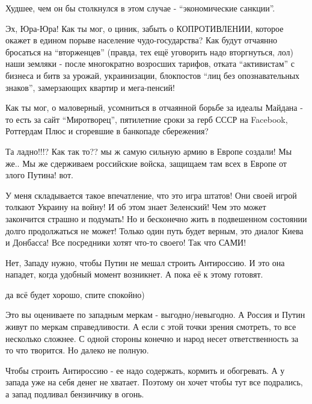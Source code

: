 \begin{itemize}

Худшее, чем он бы столкнулся в этом случае - \enquote{экономические санкции}.

Эх, Юра-Юра! Как ты мог, о циник, забыть о КОПРОТИВЛЕНИИ, которое окажет в
едином порыве население чудо-государства? Как будут отчаянно бросаться на
\enquote{вторженцев} (правда, тех ещё уговорить надо вторгнуться, лол) наши земляки -
после многократно возросших тарифов, отката \enquote{активистам} с бизнеса  и битв за
урожай, украинизации, блокпостов \enquote{лиц без опознавательных знаков}, замерзающих
квартир и мега-пенсий! 

Как ты мог, о маловерный, усомниться в отчаянной борьбе за идеалы Майдана - то
есть за сайт \enquote{Миротворец}, пятилетние сроки за герб СССР на Facebook, Роттердам
Плюс и сгоревшие в банкопаде сбережения?


Та ладно!!!? Как так то?? мы ж самую сильную армию в Европе создали! Мы же.. Мы
же сдерживаем российские войска, защищаем там всех в Европе от злого Путина!
вот.


У меня складывается такое впечатление, что это игра штатов! Они своей игрой
толкают Украину на войну! И об этом знает Зеленский! Чем это может закончится
страшно и подумать! Но и бесконечно жить в подвешенном состоянии долго
продолжаться не может! Только один путь будет верным, это диалог Киева и
Донбасса!  Все посредники хотят что-то своего! Так что САМИ!


Нет, Западу нужно, чтобы Путин не мешал строить Антироссию. И это она нападет,
когда удобный момент возникнет. А пока её к этому готовят.


да всё будет хорошо, спите  спокойно)


Это вы оцениваете по западным меркам - выгодно/невыгодно. А Россия и Путин
живут по меркам справедливости. А если с этой точки зрения смотреть, то все
несколько сложнее. С одной стороны конечно и народ несет ответственность за то
что творится. Но далеко не полную.


Чтобы строить Антироссию - ее надо содержать, кормить и обогревать. А у запада
уже на себя денег не хватает. Поэтому он хочет чтобы тут все подрались, а запад
подливал бензинчику в огонь.


\end{itemize}
